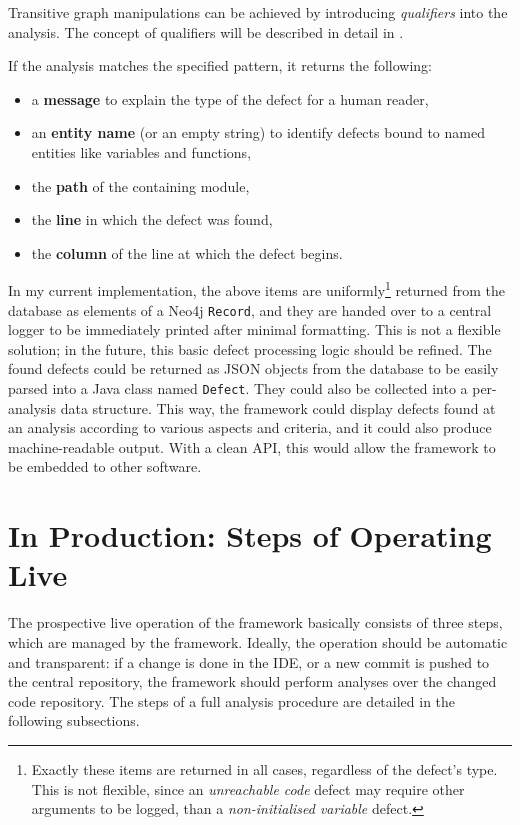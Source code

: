 Transitive graph manipulations can be achieved by introducing \emph{qualifiers} into the analysis. The concept of qualifiers will be described in detail in .

If the analysis matches the specified pattern, it returns the following:

\begin{itemize}
\item a \textbf{message} to explain the type of the defect for a human reader,
\item an \textbf{entity name} (or an empty string) to identify defects bound to named entities like variables and functions,
\item the \textbf{path} of the containing module,
\item the \textbf{line} in which the defect was found,
\item the \textbf{column} of the line at which the defect begins.
\end{itemize}

In my current implementation, the above items are uniformly\footnote{Exactly these items are returned in all cases, regardless of the defect's type. This is not flexible, since an \emph{unreachable code} defect may require other arguments to be logged, than a \emph{non-initialised variable} defect.} returned from the database as elements of a Neo4j \lstinline{Record}, and they are handed over to a central logger to be immediately printed after minimal formatting. This is not a flexible solution; in the future, this basic defect processing logic should be refined. The found defects could be returned as JSON objects from the database to be easily parsed into a Java class named \lstinline{Defect}. They could also be collected into a per-analysis data structure. This way, the framework could display defects found at an analysis according to various aspects and criteria, and it could also produce machine-readable output. With a clean API, this would allow the framework to be embedded to other software.


\section{In Production: Steps of Operating Live}

The prospective live operation of the framework basically consists of three steps, which are managed by the framework. Ideally, the operation should be automatic and transparent: if a change is done in the IDE, or a new commit is pushed to the central repository, the framework should perform analyses over the changed code repository. The steps of a full analysis procedure are detailed in the following subsections.


